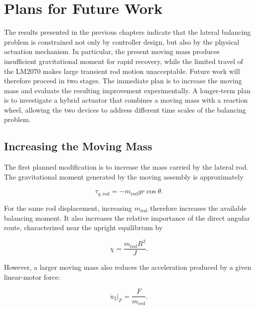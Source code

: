 \chapter{Plans for Future Work}
\label{chap:further-works}

The results presented in the previous chapters indicate that the lateral
balancing problem is constrained not only by controller design, but also by the
physical actuation mechanism. In particular, the present moving mass produces
insufficient gravitational moment for rapid recovery, while the limited travel
of the LM2070 makes large transient rod motion unacceptable. Future work will
therefore proceed in two stages. The immediate plan is to increase the moving
mass and evaluate the resulting improvement experimentally. A longer-term plan
is to investigate a hybrid actuator that combines a moving mass with a reaction
wheel, allowing the two devices to address different time scales of the
balancing problem.


\section{Increasing the Moving Mass}
\label{sec:future-increasing-rod-mass}

The first planned modification is to increase the mass carried by the lateral
rod. The gravitational moment generated by the moving assembly is approximately

\begin{equation}
\tau_{g,\mathrm{rod}}
=
-m_{\mathrm{rod}}gr\cos\theta.
\label{eq:future-rod-gravity-torque}
\end{equation}

For the same rod displacement, increasing $m_{\mathrm{rod}}$ therefore
increases the available balancing moment. It also increases the relative
importance of the direct angular route, characterized near the upright
equilibrium by

\begin{equation}
\chi
=
\frac{m_{\mathrm{rod}}R^2}{J}.
\label{eq:future-direct-route-ratio}
\end{equation}

However, a larger moving mass also reduces the acceleration produced by a given
linear-motor force:

\begin{equation}
\left.\dot{u}_2\right|_F
=
\frac{F}{m_{\mathrm{rod}}}.
\label{eq:future-heavy-rod-acceleration}
\end{equation}

